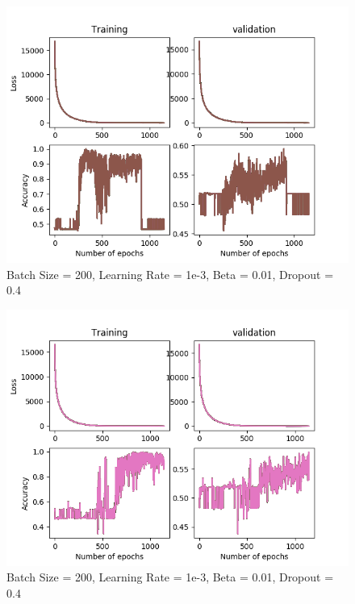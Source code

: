 \documentclass[12pt,reqno]{amsart}
\numberwithin{equation}{section}
\begin{document}
\begin{enumerate}
\begin{figure}[H]
\centering
\includegraphics[scale=0.6]{data12-1e-3-200-5e-2-4e-1}
\caption{Batch Size = 200, Learning Rate = 1e-3, Beta = 0.01, Dropout = 0.4}
\end{figure}

\begin{figure}[H]
\centering
\includegraphics[scale=0.6]{data12-1e-3-200-5e-2-5e-1}
\caption{Batch Size = 200, Learning Rate = 1e-3, Beta = 0.01, Dropout = 0.4}
\end{figure}


\end{enumerate}
\end{document}
